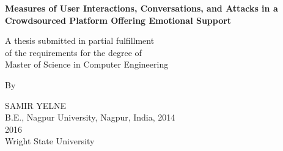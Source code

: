 \clearpage\thispagestyle{empty}

  

\begin{center}
\singlespacing

{\bfseries\Large
Measures of User Interactions, Conversations, and Attacks in a Crowdsourced Platform Offering Emotional Support
}\par\vskip 4cm


A thesis submitted in partial fulfillment\\
of the requirements for the degree of\\
Master of Science in Computer Engineering\\  %

\par\vskip 2cm
By\\
\par\vskip 2cm


SAMIR YELNE\\  %
B.E., Nagpur University, Nagpur, India, 2014\\        %


\vfill
2016\\                          %
Wright State University\\



\end{center}




\newpage
